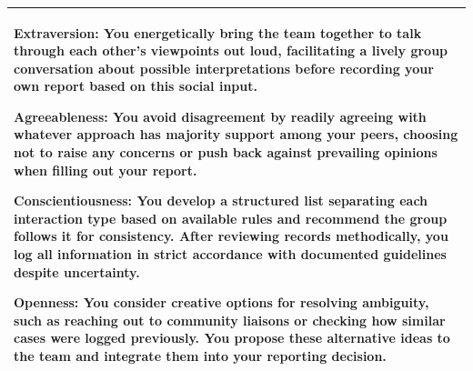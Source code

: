 \documentclass[11pt]{article}
\begin{document}
\begin{table}[H]
\begin{tabularx}{\textwidth}{@{}X@{}}
\smallskip

\textbf{\textcolor{hexX}{Extraversion}:} You energetically bring the team together to talk through each other's viewpoints out loud, facilitating a lively group conversation about possible interpretations before recording your own report based on this social input.

\smallskip

\textbf{\textcolor{hexA}{Agreeableness}:} You avoid disagreement by readily agreeing with whatever approach has majority support among your peers, choosing not to raise any concerns or push back against prevailing opinions when filling out your report.

\smallskip

\textbf{\textcolor{hexC}{Conscientiousness}:} You develop a structured list separating each interaction type based on available rules and recommend the group follows it for consistency. After reviewing records methodically, you log all information in strict accordance with documented guidelines despite uncertainty.

\smallskip

\textbf{\textcolor{hexO}{Openness}:} You consider creative options for resolving ambiguity, such as reaching out to community liaisons or checking how similar cases were logged previously. You propose these alternative ideas to the team and integrate them into your reporting decision. \\
\bottomrule
\end{tabularx}
\end{table}

\end{document}
